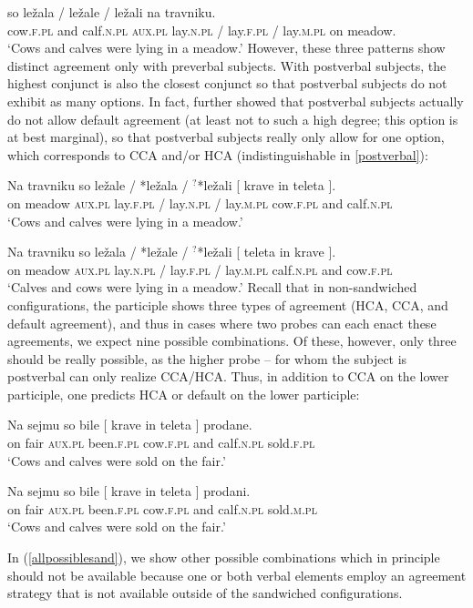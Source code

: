 \documentclass[output=paper
,modfonts
,nonflat]{langsci/langscibook}
\begin{document}
\ea \label{preverbal}
 so ležala / ležale  / ležali na travniku.\\
{} cow.\textsc{f.pl} and calf.\textsc{n.pl} {} \textsc{aux.pl} lay.\textsc{n.pl} / lay.\textsc{f.pl} / lay.\textsc{m.pl} on meadow.\\
\glt `Cows and calves were lying in a meadow.'
\z
However, these three patterns show distinct agreement only with preverbal subjects. With postverbal subjects, the highest conjunct is also the closest conjunct so that postverbal subjects do not exhibit as many options. In fact, \cite{willergold:16} further showed that postverbal subjects actually do not allow default agreement (at least not to such a high degree; this option is at best marginal), so that postverbal subjects really only allow for one option, which corresponds to CCA and/or HCA (indistinguishable in \ref{postverbal}):

\ea \label{postverbal}
\gll Na travniku so ležale / *ležala  / $^?$*ležali [ krave in teleta ].\\
on meadow \textsc{aux.pl}  lay.\textsc{f.pl} /  lay.\textsc{n.pl} /  lay.\textsc{m.pl} {} cow.\textsc{f.pl} and calf.\textsc{n.pl} {} \\
\glt `Cows and calves were lying in a meadow.'
\z


\ea \gll Na travniku so ležala / *ležale / $^?$*ležali [ teleta in krave ].\\
on meadow \textsc{aux.pl}  lay.\textsc{n.pl} /  lay.\textsc{f.pl} /  lay.\textsc{m.pl} {} calf.\textsc{n.pl} and cow.\textsc{f.pl} {} \\
\glt `Calves and cows were lying in a meadow.'
\z
Recall that in non-sandwiched configurations, the participle shows three types of agreement (HCA, CCA, and default agreement), and thus in cases where two probes can each enact these agreements, we expect nine possible combinations. Of these, however, only three should be really possible, as the higher probe -- for whom the subject is postverbal can only realize CCA/HCA. Thus, in addition to CCA on the lower participle, one predicts HCA or default on the lower participle:

\begin{exe}
\ex
\begin{xlist}
\ex \label{allhcahca}\gll Na sejmu so bile [ krave in teleta ] prodane.\\
on fair \textsc{aux.pl} been.\textsc{f.pl} {} cow.\textsc{f.pl} and calf.\textsc{n.pl} {} sold.\textsc{f.pl}\\
\glt `Cows and calves were sold on the fair.'

\ex \label{allhcadef}\gll Na sejmu so bile [ krave in teleta ] prodani.\\
on fair \textsc{aux.pl} been.\textsc{f.pl} {} cow.\textsc{f.pl} and calf.\textsc{n.pl} {} sold.\textsc{m.pl} \\
\glt `Cows and calves were sold on the fair.'
\end{xlist}
\end{exe}
In (\ref{allpossiblesand}), we show other possible combinations which in principle should not be available because one or both verbal elements employ an agreement strategy that is not available outside of the sandwiched configurations. 
\end{document}
